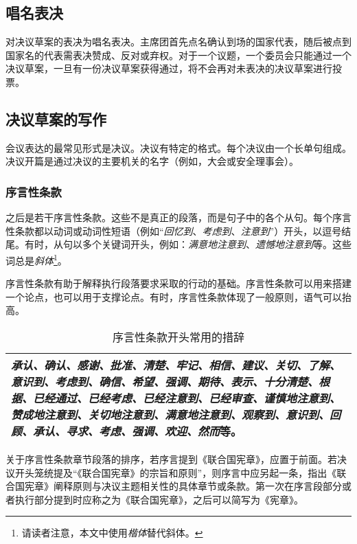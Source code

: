 \documentclass[a4paper,openany]{book}
\begin{document}
\subsection{唱名表决}

对决议草案的表决为唱名表决。主席团首先点名确认到场的国家代表，随后被点到国家名的代表需表决赞成、反对或弃权。对于一个议题，一个委员会只能通过一个决议草案，一旦有一份决议草案获得通过，将不会再对未表决的决议草案进行投票。

\subsection{决议草案的写作}

会议表达的最常见形式是决议。决议有特定的格式。每个决议由一个长单句组成。决议开篇是通过决议的主要机关的名字（例如，大会或安全理事会）。

\subsubsection{序言性条款}

之后是若干序言性条款。这些不是真正的段落，而是句子中的各个从句。每个序言性条款都以动词或动词性短语（例如“\textit{回忆到}、\textit{考虑到}、\textit{注意到}”）开头，以逗号结尾。有时，从句以多个关键词开头，例如：\textit{满意地注意到}、\textit{遗憾地注意到}等。这些词总是\textit{斜体}\footnote{请读者注意，本文中使用\textit{楷体}替代斜体。}。

序言性条款有助于解释执行段落要求采取的行动的基础。序言性条款可以用来搭建一个论点，也可以用于支撑论点。有时，序言性条款体现了一般原则，语气可以抬高。

\begin{table}[ht]
\setlength{\belowcaptionskip}{5pt}
\caption{序言性条款开头常用的措辞}
\centering
\begin{tabular}{| p{11cm} |}
\hline
\textit{承认、确认、感谢、批准、清楚、牢记、相信、建议、关切、了解、意识到、考虑到、确信、希望、强调、期待、表示、十分清楚、根据、已经通过、已经考虑、已经注意到、已经审查、谨慎地注意到、赞成地注意到、关切地注意到、满意地注意到、观察到、意识到、回顾、承认、寻求、考虑、强调、欢迎、然而}等。\\
\hline
\end{tabular}
\end{table}

关于序言性条款章节段落的排序，若序言提到《联合国宪章》，应置于前面。若决议开头笼统提及“《联合国宪章》的宗旨和原则”，则序言中应另起一条，指出《联合国宪章》阐释原则与决议主题相关性的具体章节或条款。第一次在序言段部分或者执行部分提到时应称之为《联合国宪章》，之后可以简写为《宪章》。
\end{document}
